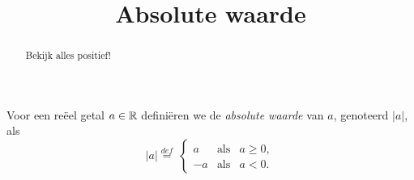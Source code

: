\documentclass{ximera}
\title[Rekenvaardigheden:]{Absolute waarde}
\begin{document}
\begin{abstract}
	Bekijk alles positief!
\end{abstract}
\maketitle

\begin{definition}
	Voor een reëel getal $a\in\mathbb R$ definiëren we de \textit{absolute waarde} van $a$, genoteerd $|a|$, als
	\[
		|a| \overset{def}{=}\displaystyle\ 
		          \left\{
			\begin{array}{rll  } 
				a  & \mbox{als} & a \geqslant 0, \\
				-a & \mbox{als} & a<0.
			\end{array}\right.
	\]
\end{definition}
\end{document}
